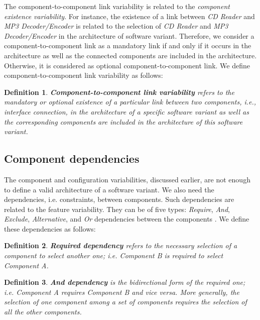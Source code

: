 \documentclass[graybox]{svmult}
\newtheorem{mydef}{Definition}
\begin{document}
 
The component-to-component link variability is related to the \textit{component existence variability}. For instance, the existence of a link between \textit{CD Reader} and \textit{MP3 Decoder/Encoder} is related to the selection of \textit{CD Reader} and \textit{MP3 Decoder/Encoder} in the architecture of software variant. Therefore, we consider a component-to-component link as a mandatory link if and only if it occurs in the architecture as well as the connected components are included in the architecture. Otherwise, it is considered as optional component-to-component link. We define component-to-component link variability as follows:


\begin{mydef}
\textbf{Component-to-component link variability}  {refers to the mandatory or optional existence of a particular link between two components, i.e., interface connection, in the architecture of a specific software variant as well as the corresponding components are included in the architecture of this software variant.}
\end{mydef}



 \subsection{Component dependencies}


The component and configuration variabilities, discussed earlier, are not enough to define a valid architecture of a software variant. We also need the  dependencies, i.e. constraints, between components. Such dependencies are related to the feature variability. They can be of five types: \textit{Require}, \textit{And},  \textit{Exclude}, \textit{Alternative}, and \textit{Or} dependencies between the components \cite{shatnawi2017recovering}. We define these dependencies as follows:
    
\begin{mydef}
\textbf{Required dependency} refers to the necessary selection of a component to select another one; i.e. \textit{Component B} is required to select \textit{Component A}.
\end{mydef}

\begin{mydef}
\textbf{And dependency} is the bidirectional form of the required one; i.e. \textit{Component A} requires \textit{Component B} and vice versa. More generally, the selection of one component among a set of components requires the selection of all the other components.
\end{mydef}
\end{document}
